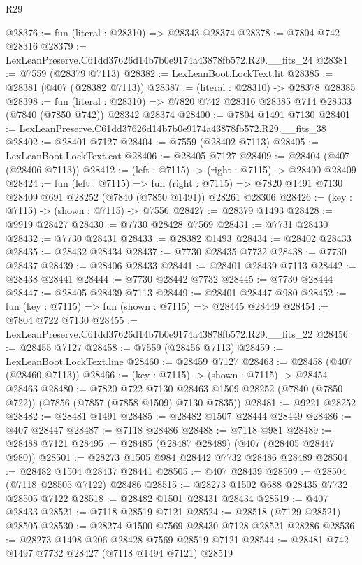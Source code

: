 \begin{lexlean}{R29}
\begin{coremodule}
@28376 := fun (literal : @28310) => @28343 @28374
@28378 := @7804 @742 @28316
@28379 := LexLeanPreserve.C61dd37626d14b7b0e9174a43878fb572.R29.__fits_24
@28381 := @7559 (@28379 @7113)
@28382 := LexLeanBoot.LockText.lit
@28385 := @28381 (@407 (@28382 @7113))
@28387 := (literal : @28310) -> @28378 @28385
@28398 := fun (literal : @28310) =>
  @7820 @742 @28316 @28385 @714 @28333 (@7840 (@7850 @742)) @28342 @28374
@28400 := @7804 @1491 @7130
@28401 := LexLeanPreserve.C61dd37626d14b7b0e9174a43878fb572.R29.__fits_38
@28402 := @28401 @7127
@28404 := @7559 (@28402 @7113)
@28405 := LexLeanBoot.LockText.cat
@28406 := @28405 @7127
@28409 := @28404 (@407 (@28406 @7113))
@28412 := (left : @7115) -> (right : @7115) -> @28400 @28409
@28424 := fun (left : @7115) =>
  fun (right : @7115) => @7820 @1491 @7130 @28409 @691 @28252 (@7840 (@7850 @1491)) @28261 @28306
@28426 := (key : @7115) -> (shown : @7115) -> @7556
@28427 := @28379 @1493
@28428 := @9919 @28427
@28430 := @7730 @28428 @7569
@28431 := @7731 @28430
@28432 := @7730 @28431
@28433 := @28382 @1493
@28434 := @28402 @28433
@28435 := @28432 @28434
@28437 := @7730 @28435 @7732
@28438 := @7730 @28437
@28439 := @28406 @28433
@28441 := @28401 @28439 @7113
@28442 := @28438 @28441
@28444 := @7730 @28442 @7732
@28445 := @7730 @28444
@28447 := @28405 @28439 @7113
@28449 := @28401 @28447 @980
@28452 := fun (key : @7115) => fun (shown : @7115) => @28445 @28449
@28454 := @7804 @722 @7130
@28455 := LexLeanPreserve.C61dd37626d14b7b0e9174a43878fb572.R29.__fits_22
@28456 := @28455 @7127
@28458 := @7559 (@28456 @7113)
@28459 := LexLeanBoot.LockText.line
@28460 := @28459 @7127
@28463 := @28458 (@407 (@28460 @7113))
@28466 := (key : @7115) -> (shown : @7115) -> @28454 @28463
@28480 := @7820
    @722
    @7130
    @28463
    @1509
    @28252
    (@7840 (@7850 @722))
    (@7856 (@7857 (@7858 @1509) @7130 @7835))
@28481 := @9221 @28252
@28482 := @28481 @1491
@28485 := @28482 @1507 @28444 @28449
@28486 := @407 @28447
@28487 := @7118 @28486
@28488 := @7118 @981
@28489 := @28488 @7121
@28495 := @28485 (@28487 @28489) (@407 (@28405 @28447 @980))
@28501 := @28273 @1505 @984 @28442 @7732 @28486 @28489
@28504 := @28482 @1504 @28437 @28441
@28505 := @407 @28439
@28509 := @28504 (@7118 @28505 @7122) @28486
@28515 := @28273 @1502 @688 @28435 @7732 @28505 @7122
@28518 := @28482 @1501 @28431 @28434
@28519 := @407 @28433
@28521 := @7118 @28519 @7121
@28524 := @28518 (@7129 @28521) @28505
@28530 := @28274 @1500 @7569 @28430 @7128 @28521 @28286
@28536 := @28273 @1498 @206 @28428 @7569 @28519 @7121
@28544 := @28481 @742 @1497 @7732 @28427 (@7118 @1494 @7121) @28519

\end{coremodule}
\end{lexlean}
